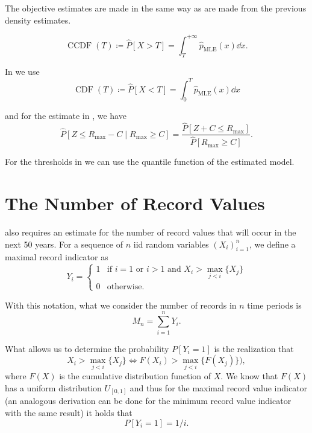 The objective estimates are made in the same way as are made from the previous density estimates.

\[
    \mathop{CCDF}(T) \coloneqq \hat{P}[ X > T ] = \int_{T}^{+\infty} \hat{p}_{\text{MLE}}(x) \dd{x}.
\]

\begin{table}[h!]
    \centering
    
\end{table}

In  we use
\[
    \mathop{CDF}(T) \coloneqq \hat{P}[ X < T ] = \int^{T}_{0} \hat{p}_{\text{MLE}}(x) \dd{x}
\]

and for the estimate in , we have
\[
\hat{P}[ Z \le R_{\max} - C \mid R_{\max} \ge C ] = \frac{\hat{P}[ Z + C \le R_{\max} ]}{\hat{P}[ R_{\max} \ge C ]}.
\] 

\begin{table}[h!]
    \centering
    
\end{table}


For the thresholds in  we can use the quantile function of the estimated model.
\begin{table}[h!]
    \centering
    
\end{table}

\section{The Number of Record Values}%
\label{sec:the_number_of_record_values}%

 also requires an estimate for the number of record values that will occur in the next 50 years. For
a sequence of \(n\) \ac{iid} random variables \((X_i)_{i=1}^n\), we define a maximal record indicator as \[
    Y_i = \begin{cases}
        1 & \text{if } i = 1 \text{ or } i > 1 \text{ and } X_i > \max_{j < i} \{ X_j\}\\
        0 & \text{otherwise.}
    \end{cases}
\] 

With this notation, what we consider the number of records in \(n\) time periods is \[
    M_n = \sum_{i = 1}^{n} Y_i.
\] 

What allows us to determine the probability \(P[Y_i = 1]\) is the realization that \[
    X_i > \max_{j < i} \{ X_j \} \Leftrightarrow F(X_i) > \max_{j < i} \{ F(X_j)\}),
\] 
where \(F(X)\) is the cumulative distribution function of \(X\). We know that \(F(X)\) has a uniform distribution
\(U_{[0,1]}\) and thus for the maximal record value indicator (an analogous derivation can be done for the minimum record
value indicator with the same result) it holds that \[
    P[Y_i = 1] = 1/i.
\] 

